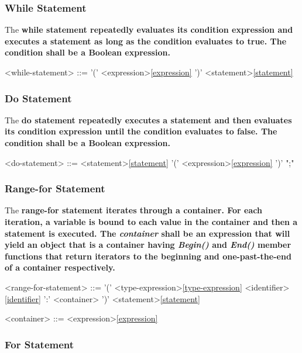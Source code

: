 \documentclass[a4paper,oneside,11pt]{article}
\begin{document}
\subsubsection{While Statement}

The \bf{while} statement repeatedly evaluates its condition expression and executes a statement as long as the condition evaluates to \bf{true}.
The condition shall be a Boolean expression.

\begin{grammar}
\label{while-statement}<while-statement> ::=  '(' <expression>\ref{expression} ')' <statement>\ref{statement}
\end{grammar}

\subsubsection{Do Statement}

The \bf{do} statement repeatedly executes a statement and then evaluates its condition expression until the condition evaluates to \bf{false}.
The condition shall be a Boolean expression.

\begin{grammar}
\label{do-statement}<do-statement> ::=  <statement>\ref{statement}  '(' <expression>\ref{expression} ')' ";"
\end{grammar}

\subsubsection{Range-for Statement}
The \bf{range-for} statement iterates through a container.
For each iteration, a variable is bound to each value in the container and then a statement is executed.
The \emph{container} shall be an expression that will yield an object that is a container having \emph{Begin()} and \emph{End()} member functions
that return iterators to the beginning and one-past-the-end of a container respectively.

\begin{grammar}
\label{range-for-statement}<range-for-statement> ::=  '(' <type-expression>\ref{type-expression} <identifier>\ref{identifier} ':' <container> ')' <statement>\ref{statement}

<container> ::= <expression>\ref{expression}
\end{grammar}

\subsubsection{For Statement}
\end{document}
